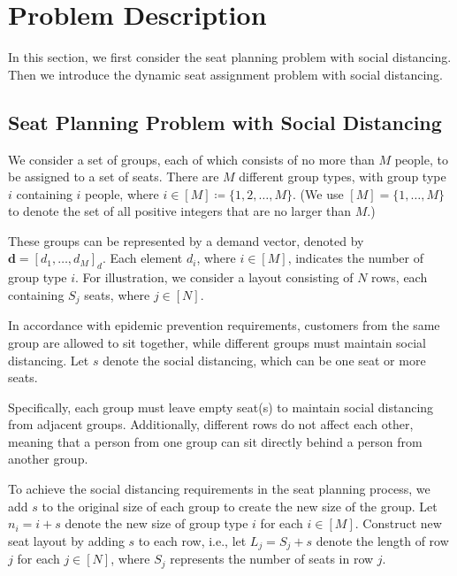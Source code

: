 \section{Problem Description}
In this section, we first consider the seat planning problem with social distancing. Then we introduce the dynamic seat assignment problem with social distancing.





\subsection{Seat Planning Problem with Social Distancing}\label{dynamic_demand}
We consider a set of groups, each of which consists of no more than $M$ people, to be assigned to a set of seats. There are $M$ different group types, with group type $i$ containing $i$ people, where $i \in [M] \coloneqq \{1,2, \ldots, M\}$. (We use $[M] = \{1, \ldots, M\}$ to denote the set of all positive integers that are no larger than $M$.)

These groups can be represented by a demand vector, denoted by $\mathbf{d} = [d_1, \ldots, d_M]_d$. Each element $d_i$, where $i \in [M]$, indicates the number of group type $i$. For illustration, we consider a layout consisting of $N$ rows, each containing $S_j$ seats, where $j \in [N]$.

In accordance with epidemic prevention requirements, customers from the same group are allowed to sit together, while different groups must maintain social distancing. Let $s$ denote the social distancing, which can be one seat or more seats.

Specifically, each group must leave empty seat(s) to maintain social distancing from adjacent groups. Additionally, different rows do not affect each other, meaning that a person from one group can sit directly behind a person from another group.


To achieve the social distancing requirements in the seat planning process, we add $s$ to the original size of each group to create the new size of the group. Let $n_i = i + s$ denote the new size of group type $i$ for each $i \in [M]$. Construct new seat layout by adding $s$ to each row, i.e., let $L_j = S_j + s$ denote the length of row $j$ for each $j \in [N]$, where $S_j$ represents the number of seats in row $j$.


